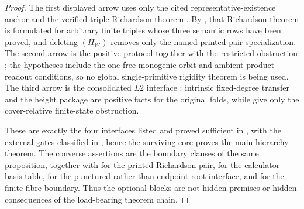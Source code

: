 \begin{proof}
The first displayed arrow uses only the cited representative-existence anchor
 and the verified-triple
Richardson theorem .
By
,
that Richardson theorem is formulated for arbitrary finite triples whose three
semantic rows have been proved, and deleting \((H_{\mathcal W})\) removes only the
named printed-pair specialization.  The second arrow is the positive protocol
 together with
the restricted obstruction
;
the hypotheses include the one-free-monogenic-orbit and ambient-product readout
conditions, so no global single-primitive rigidity theorem is being used.  The
third arrow is the consolidated \(L2\) interface
: intrinsic fixed-degree transfer and the
height package are positive facts for the original folds, while
 give only
the cover-relative finite-state obstruction.

These are exactly the four interfaces listed and proved sufficient in
, with the external gates classified
in ; hence the surviving core proves the
main hierarchy theorem.  The converse assertions are the boundary clauses of the
same proposition, together with
for the printed Richardson pair,
 for the
calculator-basis table,  for the punctured rather than
endpoint root interface, and
for the finite-fibre boundary.  Thus the optional blocks are not hidden premises
or hidden consequences of the load-bearing theorem chain.

\end{proof}

